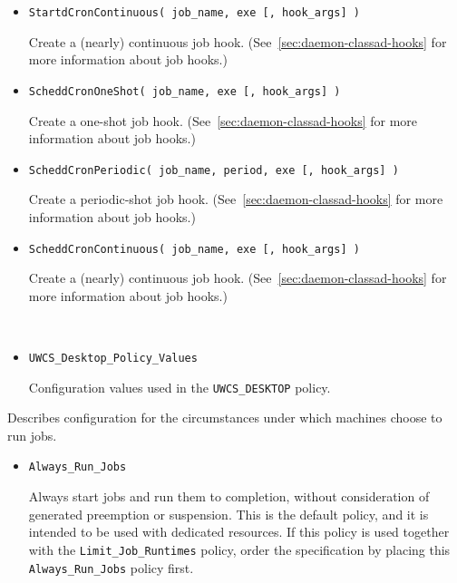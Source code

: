 \begin{description}
\begin{itemize}
    \item \texttt{StartdCronContinuous( job\_name, exe [, hook\_args] )}

	Create a (nearly) continuous  job hook.
	(See~\ref{sec:daemon-classad-hooks} for more information about job hooks.)

    \item \texttt{ScheddCronOneShot( job\_name, exe [, hook\_args] )}

	Create a one-shot  job hook.
	(See~\ref{sec:daemon-classad-hooks} for more information about job hooks.)

    \item \texttt{ScheddCronPeriodic( job\_name, period, exe [, hook\_args] )}

	Create a periodic-shot  job hook.
	(See~\ref{sec:daemon-classad-hooks} for more information about job hooks.)

    \item \texttt{ScheddCronContinuous( job\_name, exe [, hook\_args] )}

	Create a (nearly) continuous  job hook.
	(See~\ref{sec:daemon-classad-hooks} for more information about job hooks.)

\
    \item \texttt{UWCS\_Desktop\_Policy\_Values}

	Configuration values used in the \texttt{UWCS\_DESKTOP} policy.
  \end{itemize}

\label{usecategory:POLICY}
\item[\MacroNI{POLICY category}]
  Describes configuration for the circumstances under which
  machines choose to run jobs.
  \begin{itemize}

    \item \texttt{Always\_Run\_Jobs}

    Always start jobs and run them to completion, without consideration of
    \Condor{negotiator} generated preemption or suspension.
    This is the default policy, and it is intended to be used with dedicated
    resources.
    If this policy is used together with the \texttt{Limit\_Job\_Runtimes}
    policy,
    order the specification by placing this \texttt{Always\_Run\_Jobs} 
    policy first. 


\end{itemize}
\end{description}
